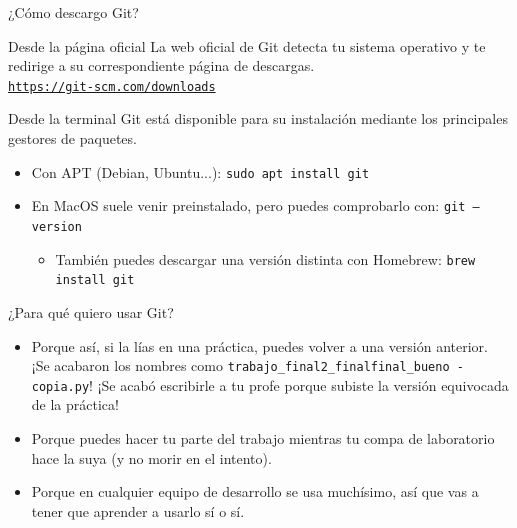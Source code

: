 \documentclass[11pt]{beamer}
\begin{document}
\begin{frame}[fragile]{¿Cómo descargo Git?}

    \begin{block}{Desde la página oficial}
    La web oficial de Git detecta tu sistema operativo y te redirige a su correspondiente página de descargas.
    \\
    \href{https://git-scm.com/downloads}{\texttt{https://git-scm.com/downloads}}
    \end{block}
    
    \begin{block}{Desde la terminal}
    Git está disponible para su instalación mediante los principales gestores de paquetes.
        \begin{itemize}
            \item Con APT (Debian, Ubuntu...): \texttt{sudo apt install git}
            \item En MacOS suele venir preinstalado, pero puedes comprobarlo con: \texttt{git --version}
                \begin{itemize}
                    \item También puedes descargar una versión distinta con Homebrew: \texttt{brew install git}
                \end{itemize}
        \end{itemize}
	\end{block}

\end{frame}


\begin{frame}{¿Para qué quiero usar Git?}

    \begin{itemize}
        \item Porque así, si la lías en una práctica, puedes volver a una versión anterior. \\ \footnotesize ¡Se acabaron los nombres como \texttt{trabajo\_final2\_finalfinal\_bueno - copia.py}! ¡Se acabó escribirle a tu profe porque subiste la versión equivocada de la práctica! \normalsize
        \item Porque puedes hacer tu parte del trabajo mientras tu compa de laboratorio hace la suya (y no morir en el intento).
        \item Porque en cualquier equipo de desarrollo se usa muchísimo, así que vas a tener que aprender a usarlo sí o sí.
    \end{itemize}
    
\end{frame}
\end{document}
